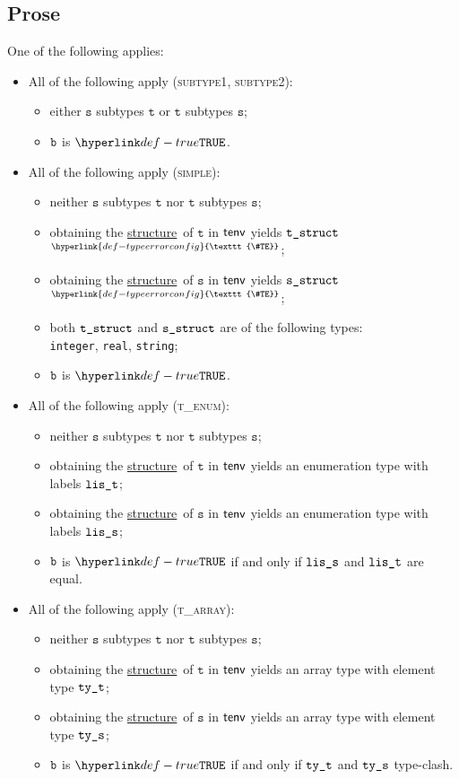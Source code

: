 \documentclass{book}
\newcommand\TypeErrorConfig[0]{\hyperlink{def-typeerrorconfig}{\texttt{\#TE}}}
\newcommand\ProseOrTypeError[0]{\hyperlink{def-proseortypeerror}{$^{\TypeErrorConfig}$}}
\newcommand\structure[0]{\hyperlink{def-structure}{structure}}
\newcommand\vt[0]{\texttt{t}}
\newcommand\vs[0]{\texttt{s}}
\begin{document}
\subsection{Prose}
 One of the following applies:
\begin{itemize}
  \item All of the following apply (\textsc{subtype1}, \textsc{subtype2}):
  \begin{itemize}
    \item either $\vs$ subtypes $\vt$ or $\vt$ subtypes $\vs$;
    \item $\texttt{b}$ is $\True$.
  \end{itemize}

  \item All of the following apply (\textsc{simple}):
  \begin{itemize}
    \item neither $\vs$ subtypes $\vt$ nor $\vt$ subtypes $\vs$;
    \item obtaining the \structure\ of $\vt$ in $\textsf{tenv}$ yields $\texttt{t\_struct}$ \ProseOrTypeError;
    \item obtaining the \structure\ of $\vs$ in $\textsf{tenv}$ yields $\texttt{s\_struct}$ \ProseOrTypeError;
    \item both $\texttt{t\_struct}$ and $\texttt{s\_struct}$ are of the following types: \\ \texttt{integer}, \texttt{real}, \texttt{string};
    \item $\texttt{b}$ is $\True$.
  \end{itemize}

  \item All of the following apply (\textsc{t\_enum}):
  \begin{itemize}
    \item neither $\vs$ subtypes $\vt$ nor $\vt$ subtypes $\vs$;
    \item obtaining the \structure\ of $\vt$ in $\textsf{tenv}$ yields an enumeration type with labels $\texttt{lis\_t}$;
    \item obtaining the \structure\ of $\vs$ in $\textsf{tenv}$ yields an enumeration type with labels $\texttt{lis\_s}$;
    \item $\texttt{b}$ is $\True$ if and only if $\texttt{lis\_s}$ and $\texttt{lis\_t}$ are equal.
  \end{itemize}

  \item All of the following apply (\textsc{t\_array}):
  \begin{itemize}
    \item neither $\vs$ subtypes $\vt$ nor $\vt$ subtypes $\vs$;
    \item obtaining the \structure\ of $\vt$ in $\textsf{tenv}$ yields an array type with element type $\texttt{ty\_t}$;
    \item obtaining the \structure\ of $\vs$ in $\textsf{tenv}$ yields an array type with element type $\texttt{ty\_s}$;
    \item $\texttt{b}$ is $\True$ if and only if $\texttt{ty\_t}$ and $\texttt{ty\_s}$ type-clash.
  \end{itemize}


\end{itemize}
\end{document}
